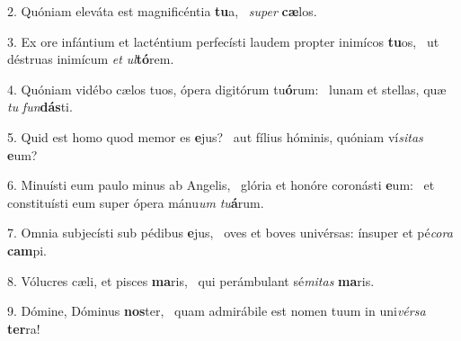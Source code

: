2. Quóniam eleváta est magnificéntia \textbf{tu}a, \ast\  \textit{su}\textit{per} \textbf{cæ}los.\

3. Ex ore infántium et lacténtium perfecísti laudem propter inimícos \textbf{tu}os, \ast\  ut déstruas inimícum \textit{et} \textit{ul}\textbf{tó}rem.\

4. Quóniam vidébo cælos tuos, ópera digitórum tu\textbf{ó}rum: \ast\  lunam et stellas, quæ \textit{tu} \textit{fun}\textbf{dás}ti.\

5. Quid est homo quod memor es \textbf{e}jus? \ast\  aut fílius hóminis, quóniam ví\textit{si}\textit{tas} \textbf{e}um?\

6. Minuísti eum paulo minus ab Angelis, \dag\  glória et honóre coronásti \textbf{e}um: \ast\  et constituísti eum super ópera mánu\textit{um} \textit{tu}\textbf{á}rum.\

7. Omnia subjecísti sub pédibus \textbf{e}jus, \ast\  oves et boves univérsas: ínsuper et pé\textit{co}\textit{ra} \textbf{cam}pi.\

8. Vólucres cæli, et pisces \textbf{ma}ris, \ast\  qui perámbulant sé\textit{mi}\textit{tas} \textbf{ma}ris.\

9. Dómine, Dóminus \textbf{nos}ter, \ast\  quam admirábile est nomen tuum in uni\textit{vér}\textit{sa} \textbf{ter}ra!\

